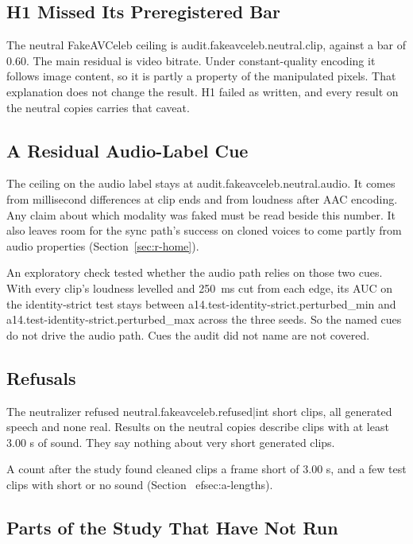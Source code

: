 \subsection{H1 Missed Its Preregistered Bar}

The neutral FakeAVCeleb ceiling is {{audit.fakeavceleb.neutral.clip}}, against
a bar of 0.60. The main residual is video bitrate. Under constant-quality
encoding it follows image content, so it is partly a property of the
manipulated pixels. That explanation does not change the result. H1 failed as
written, and every result on the neutral copies carries that caveat.

\subsection{A Residual Audio-Label Cue}

The ceiling on the audio label stays at {{audit.fakeavceleb.neutral.audio}}.
It comes from millisecond differences at clip ends and from loudness after
AAC encoding. Any claim about which modality was faked must be read beside
this number. It also leaves room for the sync path's success on cloned voices
to come partly from audio properties (Section~\ref{sec:r-home}).

An exploratory check tested whether the audio path relies on those two
cues. With every clip's loudness levelled and 250~ms cut from each edge, its
AUC on the identity-strict test stays between
{{a14.test-identity-strict.perturbed_min}} and
{{a14.test-identity-strict.perturbed_max}} across the three seeds. So the
named cues do not drive the audio path. Cues the audit did not name are not
covered.

\subsection{Refusals}

The neutralizer refused {{neutral.fakeavceleb.refused|int}} short clips, all
generated speech and none real. Results on the neutral copies describe clips
with at least 3.00 s of sound. They say nothing about very short generated
clips.

A count after the study found cleaned clips a frame short of 3.00 s, and a few
test clips with short or no sound (Section~
ef{sec:a-lengths}).

\subsection{Parts of the Study That Have Not Run}

